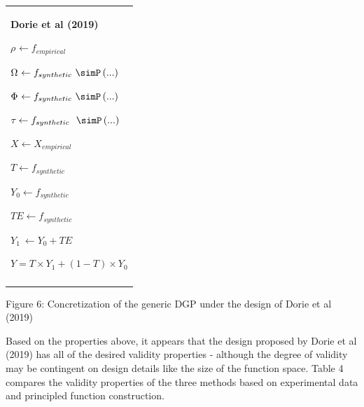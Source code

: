 \documentclass[../main.tex]{subfiles}
\begin{document}
\begin{table}[H]
 			\centering
\begin{tabular}{p{3.14in}}
\hline
\multicolumn{1}{|p{3.14in}|}{\textbf{Dorie et al (2019)} \par  \(  \rho _{} \leftarrow f_{empirical}~ \)  \par  \(  \Omega _{} \leftarrow f_{synthetic}~\simP \left( ... \right)  _{} \)  \par  \(  \Phi _{} \leftarrow f_{synthetic}~\simP \left( ... \right)  _{} \)  \par  \(  \tau_{} \leftarrow f_{synthetic}~~\simP \left( ... \right)  _{} \)  \par  \( X \leftarrow X_{empirical} \)  \par  \( T \leftarrow f_{synthetic} \)  \par  \( Y_{0} \leftarrow f_{synthetic} \)  \par  \( TE \leftarrow f_{synthetic} \)  \par  \( Y_{1}~ \leftarrow Y_{0}+ TE \)  \par  \( Y = T \times Y_{1}+  \left( 1-T \right)  \times Y_{0} \)  \par } \\
\hhline{-}

\end{tabular}
 \end{table}




\vspace{\baselineskip}
Figure 6: Concretization of the generic DGP under the design of Dorie et al (2019)\par


\vspace{\baselineskip}
Based on the properties above, it appears that the design proposed by Dorie et al (2019) has all of the desired validity properties - although the degree of validity may be contingent on design details like the size of the function space. Table 4 compares the validity properties of the three methods based on experimental data and principled function construction.


\vspace{\baselineskip}


\end{document}
